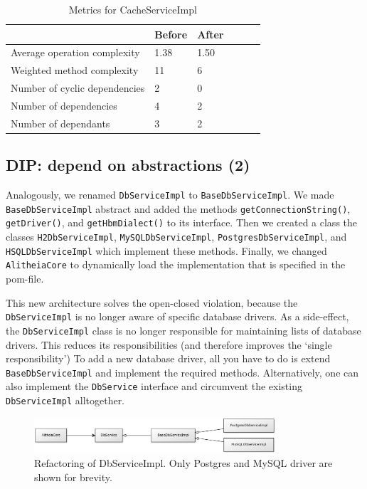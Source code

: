 \documentclass{article}
\begin{document}
\begin{table}[h]
	\centering
    \begin{tabular}{l|llll}
    ~                                 & Before & After & ~ & ~ \\ \hline
    Average operation complexity      & 1.38 & 1.50 \\
    Weighted method complexity        & 11   & 6 \\
    Number of cyclic dependencies     & 2    & 0 \\
    Number of dependencies            & 4    & 2 \\
    Number of dependants              & 3    & 2 \\
    \end{tabular}
    \caption{Metrics for CacheServiceImpl}
\end{table}

\subsection{DIP: depend on abstractions (2)}
Analogously, we renamed \verb|DbServiceImpl| to \verb|BaseDbServiceImpl|. We made \verb|BaseDbServiceImpl| abstract and added the methods \verb|getConnectionString()|, \verb|getDriver()|, and \verb|getHbmDialect()| to its interface. Then we created a class the classes \verb|H2DbServiceImpl|, \verb|MySQLDbServiceImpl|, \verb|PostgresDbServiceImpl|, and \verb|HSQLDbServiceImpl| which implement these methods. Finally, we changed \verb|AlitheiaCore| to dynamically load the implementation that is specified in the pom-file.

This new architecture solves the open-closed violation, because the \verb|DbServiceImpl| is no longer aware of specific database drivers. As a side-effect, the \verb|DbServiceImpl| class is no longer responsible for maintaining lists of database drivers. This reduces its responsibilities (and therefore improves the `single responsibility') To add a new database driver, all you have to do is extend \verb|BaseDbServiceImpl| and implement the required methods. Alternatively, one can also implement the \verb|DbService| interface and circumvent the existing \verb|DbServiceImpl| alltogether.

\begin{figure}[h]
    \centering
    \includegraphics[width=0.8\textwidth]{dbs}
    \caption{Refactoring of DbServiceImpl. Only Postgres and MySQL driver are shown for brevity.}
    \label{fig:dbs}
\end{figure}
\end{document}
